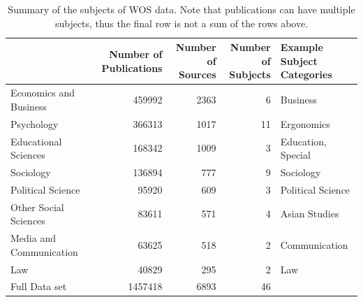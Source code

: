 \documentclass[12pt, a4paper]{article}
\begin{document}
\begin{table}[h]
	\centering
	\begin{adjustbox}{center}
		\begin{tabular}{lrrrl}
			\toprule
			{} &  \pbox{20cm}{Number of \\Publications}  &  \pbox{20cm}{Number of\\Sources}&  \pbox{20cm}{Number of \\Subjects} &   \pbox{20cm}{Example Subject\\Categories} \\
			\midrule
			Economics and Business  &            \num{459992} &              \num{2363} &                  \num{6} &            Business \\
			Psychology              &            \num{366313} &              \num{1017} &                 \num{11} &          Ergonomics \\
			Educational Sciences    &            \num{168342} &              \num{1009} &                  \num{3} &  Education, Special \\
			Sociology               &            \num{136894} &               \num{777} &                  \num{9} &           Sociology \\
			Political Science       &             \num{95920} &               \num{609} &                  \num{3} &   Political Science \\
			Other Social Sciences   &             \num{83611} &               \num{571} &                  \num{4} &       Asian Studies \\
			Media and Communication &             \num{63625} &               \num{518} &                  \num{2} &       Communication \\
			Law                     &             \num{40829} &               \num{295} &                  \num{2} &                 Law \\
			\midrule
			Full Data set           &           \num{1457418} &              \num{6893} &                 \num{46} &                     \\
			\bottomrule
		\end{tabular}
	\end{adjustbox}
	\caption{Summary of the subjects of WOS data. Note that publications can have multiple subjects, thus the final row is not a sum of the rows above.}\label{sum_1}
\end{table}
\end{document}
